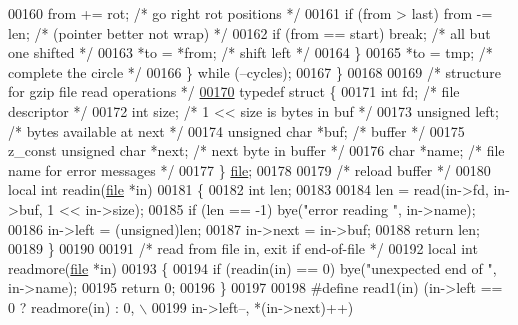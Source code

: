 \begin{DoxyCode}
{00160             from += rot;                \textcolor{comment}{/* go right rot positions */}
00161             \textcolor{keywordflow}{if} (from > last) from -= len;   \textcolor{comment}{/* (pointer better not wrap) */}
00162             \textcolor{keywordflow}{if} (from == start) \textcolor{keywordflow}{break};   \textcolor{comment}{/* all but one shifted */}
00163             *to = *from;                \textcolor{comment}{/* shift left */}
00164         \}
00165         *to = tmp;                      \textcolor{comment}{/* complete the circle */}
00166     \} \textcolor{keywordflow}{while} (--cycles);
00167 \}
00168 
00169 \textcolor{comment}{/* structure for gzip file read operations */}
\hyperlink{structfile}{00170} \textcolor{keyword}{typedef} \textcolor{keyword}{struct }\{
00171     \textcolor{keywordtype}{int} fd;                     \textcolor{comment}{/* file descriptor */}
00172     \textcolor{keywordtype}{int} size;                   \textcolor{comment}{/* 1 << size is bytes in buf */}
00173     \textcolor{keywordtype}{unsigned} left;              \textcolor{comment}{/* bytes available at next */}
00174     \textcolor{keywordtype}{unsigned} \textcolor{keywordtype}{char} *buf;         \textcolor{comment}{/* buffer */}
00175     z\_const \textcolor{keywordtype}{unsigned} \textcolor{keywordtype}{char} *next;    \textcolor{comment}{/* next byte in buffer */}
00176     \textcolor{keywordtype}{char} *name;                 \textcolor{comment}{/* file name for error messages */}
00177 \} \hyperlink{structfile}{file};
00178 
00179 \textcolor{comment}{/* reload buffer */}
00180 local \textcolor{keywordtype}{int} readin(\hyperlink{structfile}{file} *in)
00181 \{
00182     \textcolor{keywordtype}{int} len;
00183 
00184     len = read(in->fd, in->buf, 1 << in->size);
00185     \textcolor{keywordflow}{if} (len == -1) bye(\textcolor{stringliteral}{"error reading "}, in->name);
00186     in->left = (unsigned)len;
00187     in->next = in->buf;
00188     \textcolor{keywordflow}{return} len;
00189 \}
00190 
00191 \textcolor{comment}{/* read from file in, exit if end-of-file */}
00192 local \textcolor{keywordtype}{int} readmore(\hyperlink{structfile}{file} *in)
00193 \{
00194     \textcolor{keywordflow}{if} (readin(in) == 0) bye(\textcolor{stringliteral}{"unexpected end of "}, in->name);
00195     \textcolor{keywordflow}{return} 0;
00196 \}
00197 
00198 \textcolor{preprocessor}{#define read1(in) (in->left == 0 ? readmore(in) : 0, \(\backslash\)}
00199 \textcolor{preprocessor}{                   in->left--, *(in->next)++)}
}
\end{DoxyCode}
